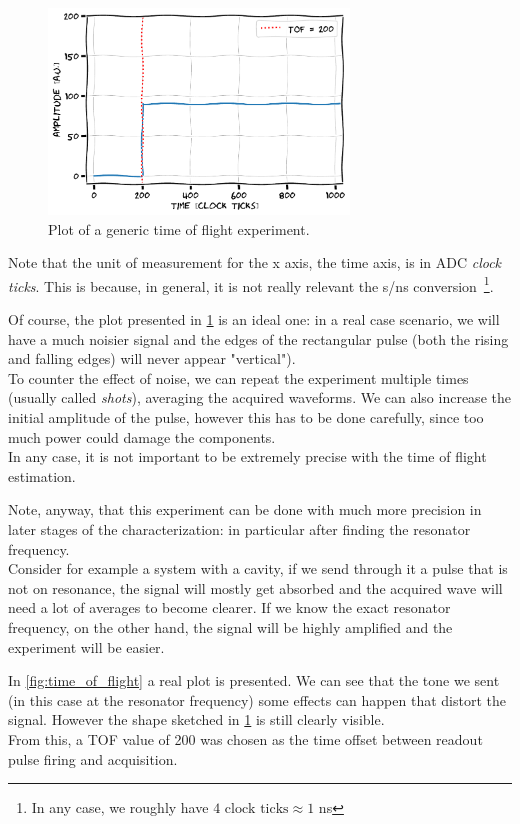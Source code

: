 \begin{figure}[ht]
    \centering
    \includegraphics[width=8cm]{characterization/figures/time_of_flight_sketch.pdf}
    \caption{Plot of a generic time of flight experiment.}
    \label{fig:time_of_flight_sketch}
\end{figure}

Note that the unit of measurement for the x axis, the time axis, is in ADC \textit{clock ticks}.
This is because, in general, it is not really relevant the s/ns conversion~\footnote{In any case, we roughly have $4\text{ clock ticks} \approx 1$ ns}.

Of course, the plot presented in \cref{fig:time_of_flight_sketch} is an ideal one: in a real case scenario, we will have a much noisier signal and the edges of the rectangular pulse (both the rising and falling edges) will never appear "vertical").\\
To counter the effect of noise, we can repeat the experiment multiple times (usually called \textit{shots}), averaging the acquired waveforms.
We can also increase the initial amplitude of the pulse, however this has to be done carefully, since too much power could damage the components.\\
In any case, it is not important to be extremely precise with the time of flight estimation.

Note, anyway, that this experiment can be done with much more precision in later stages of the characterization: in particular after finding the resonator frequency.\\
Consider for example a system with a cavity, if we send through it a pulse that is not on resonance, the signal will mostly get absorbed and the acquired wave will need a lot of averages to become clearer.
If we know the exact resonator frequency, on the other hand, the signal will be highly amplified and the experiment will be easier.

In \cref{fig:time_of_flight} a real plot is presented.
We can see that the tone we sent (in this case at the resonator frequency) some effects can happen that distort the signal. 
However the shape sketched in \cref{fig:time_of_flight_sketch} is still clearly visible.\\
From this, a TOF value of 200 was chosen as the time offset between readout pulse firing and acquisition.

